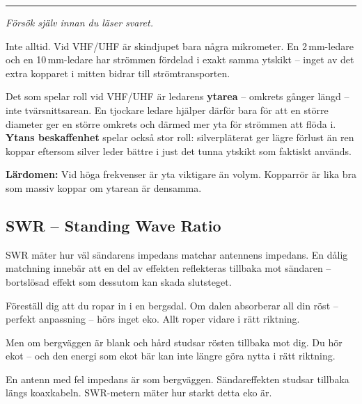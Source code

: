 \documentclass[a4paper,11pt,twoside]{book}
\newcommand{\emoji}[1]{{\emojifont #1}}
\begin{document}
\medskip
\noindent\rule{\textwidth}{0.4pt}
{\small\itshape Försök själv innan du läser svaret.}
\medskip

\begin{worked}[title={Lösning -- Fallgropsfråga 1.7.7\,F}]
Inte alltid. Vid VHF/UHF är skindjupet bara några
mikrometer. En 2\,mm-ledare och en 10\,mm-ledare
har strömmen fördelad i exakt samma ytskikt --
inget av det extra kopparet i mitten bidrar till
strömtransporten.

Det som spelar roll vid VHF/UHF är ledarens
\textbf{ytarea} -- omkrets gånger längd -- inte
tvärsnittsarean. En tjockare ledare hjälper
därför bara för att en större diameter ger
en större omkrets och därmed mer yta för strömmen
att flöda i. \textbf{Ytans beskaffenhet} spelar
också stor roll: silverpläterat ger lägre förlust
än ren koppar eftersom silver leder bättre i
just det tunna ytskikt som faktiskt används.

\textbf{Lärdomen:} Vid höga frekvenser är yta
viktigare än volym. Kopparrör är lika bra som
massiv koppar om ytarean är densamma.
\end{worked}


\subsection{SWR -- Standing Wave Ratio}

SWR mäter hur väl sändarens impedans matchar 
antennens impedans. En dålig matchning innebär 
att en del av effekten reflekteras tillbaka mot 
sändaren -- bortslösad effekt som dessutom kan 
skada slutsteget.

\begin{storybox}[{\emoji{💡} Ekot i bergsdalen}]
Föreställ dig att du ropar in i en bergsdal. 
Om dalen absorberar all din röst -- perfekt 
anpassning -- hörs inget eko. Allt roper vidare 
i rätt riktning.

Men om bergväggen är blank och hård studsar 
rösten tillbaka mot dig. Du hör ekot -- och 
den energi som ekot bär kan inte längre göra 
nytta i rätt riktning.

En antenn med fel impedans är som bergväggen. 
Sändareffekten studsar tillbaka längs koaxkabeln. 
SWR-metern mäter hur starkt detta eko är.
\end{storybox}
\end{document}
